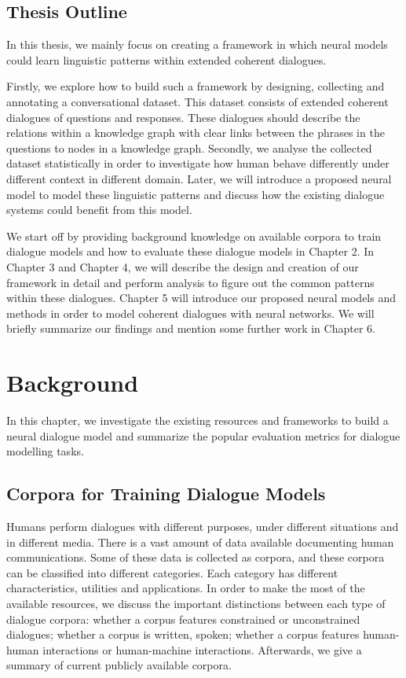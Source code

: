 \documentclass[bsc,frontabs,twoside,singlespacing,parskip,deptreport]{infthesis}     %
\begin{document}
\section {Thesis Outline}

In this thesis, we mainly focus on creating a framework in which neural models could learn linguistic patterns within extended coherent dialogues.

Firstly, we explore how to build such a framework by designing, collecting and annotating a conversational dataset. This dataset consists of extended coherent dialogues of questions and responses. These dialogues should describe the relations within a knowledge graph with clear links between the phrases in the questions to nodes in a knowledge graph. Secondly, we analyse the collected dataset statistically in order to investigate how human behave differently under different context in different domain. Later, we will introduce a proposed neural model to model these linguistic patterns and discuss how the existing dialogue systems could benefit from this model.

We start off by providing background knowledge on available corpora to train dialogue models and how to evaluate these dialogue models in Chapter 2. In Chapter 3 and Chapter 4, we will describe the design and creation of our framework in detail and perform analysis to figure out the common patterns within these dialogues. Chapter 5 will introduce our proposed neural models and methods in order to model coherent dialogues with neural networks. We will briefly summarize our findings and mention some further work in Chapter 6.

\chapter{Background}

In this chapter, we investigate the existing resources and frameworks to build a neural dialogue model and summarize the popular evaluation metrics for dialogue modelling tasks.

\section{Corpora for Training Dialogue Models}

Humans perform dialogues with different purposes, under different situations and in different media. There is a vast amount of data available documenting human communications. Some of these data is collected as corpora, and these corpora can be classified into different categories. Each category has different characteristics, utilities and applications. In order to make the most of the available resources, we discuss the important distinctions between each type of dialogue corpora: whether a corpus features constrained or unconstrained dialogues; whether a corpus is written, spoken; whether a corpus features human-human interactions or human-machine interactions. Afterwards, we give a summary of current publicly available corpora.
\end{document}
